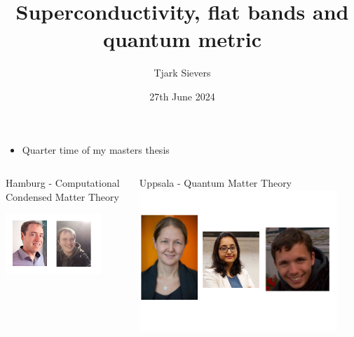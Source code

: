 \documentclass[aspectratio=169]{beamer}
\title{Superconductivity, flat bands and quantum metric}
\author{Tjark Sievers}
\date{27th June 2024}
\institute[I. ITP - Computational Condensed Matter Theory]{I. Institute of Theoretical Physics}
\begin{document}
	

{
\begin{frame}
	\titlepage
\end{frame}
}
\addtocounter{framenumber}{-1}

\begin{frame}
	
	\begin{itemize}
		\item Quarter time of my masters thesis
	\end{itemize}
	
	\begin{columns}[T]
		\begin{column}{0.5\textwidth}
			\begin{center}
				Hamburg - Computational Condensed Matter Theory
				
				\includegraphics[width=0.8\textwidth]{figs/People Tim.png}
			\end{center}	
		\end{column}
		\begin{column}{0.5\textwidth}

			
			\begin{center}
				Uppsala - Quantum Matter Theory
				\includegraphics[width=0.9\textwidth]{figs/People Annica.png}
			\end{center}
		\end{column}
	\end{columns}
\end{frame}
\end{document}
